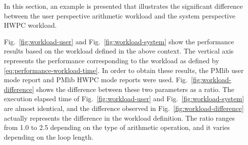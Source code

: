 \documentclass[conference]{IEEEtran}
\begin{document}
In this section, an example is presented that illustrates the significant
difference between the user perspective arithmetic workload and
the system perspective HWPC workload.

Fig.~\ref{fig:workload-user} and Fig.~\ref{fig:workload-system} show
the performance results based on the workload defined in the above context.
The vertical axis represents the performance corresponding to the workload as
defined by \eqref{eq:performance-workload-time}.
In order to obtain these results, the PMlib user mode report and PMlib HWPC
mode reports were used.
Fig.~\ref{fig:workload-difference} shows the difference between these two
parameters as a ratio.
%
%
The execution elapsed time
of Fig.~\ref{fig:workload-user} and Fig.~\ref{fig:workload-system} are
almost identical, and the difference observed in
Fig.~\ref{fig:workload-difference} 
actually represents the difference in the workload definition.
The ratio ranges from 1.0 to 2.5 depending on the type of
arithmetic operation, and it varies depending on the loop length.
\end{document}
